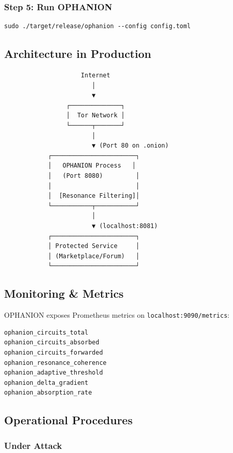 \documentclass[11pt,a4paper]{article}
\begin{document}
\subsubsection{Step 5: Run OPHANION}

\begin{verbatim}
sudo ./target/release/ophanion --config config.toml
\end{verbatim}

\subsection{Architecture in Production}

\begin{verbatim}
                     Internet
                        │
                        ▼
                 ┌──────────────┐
                 │  Tor Network │
                 └──────┬───────┘
                        │
                        ▼ (Port 80 on .onion)
            ┌───────────────────────┐
            │   OPHANION Process   │
            │   (Port 8080)         │
            │                       │
            │  [Resonance Filtering]│
            └───────────┬───────────┘
                        │
                        ▼ (localhost:8081)
            ┌───────────────────────┐
            │ Protected Service     │
            │ (Marketplace/Forum)   │
            └───────────────────────┘
\end{verbatim}

\subsection{Monitoring \& Metrics}

OPHANION exposes Prometheus metrics on \texttt{localhost:9090/metrics}:

\begin{verbatim}
ophanion_circuits_total
ophanion_circuits_absorbed
ophanion_circuits_forwarded
ophanion_resonance_coherence
ophanion_adaptive_threshold
ophanion_delta_gradient
ophanion_absorption_rate
\end{verbatim}

\subsection{Operational Procedures}

\subsubsection{Under Attack}
\end{document}
